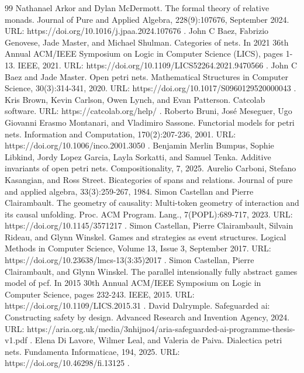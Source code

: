 \begin{thebibliography}{99}
 Nathanael Arkor and Dylan McDermott. The formal theory of relative monads. Journal of Pure and Applied Algebra, 228(9):107676, September 2024. URL: https://doi.org/10.1016/j.jpaa.2024.107676 .
 John C Baez, Fabrizio Genovese, Jade Master, and Michael Shulman. Categories of nets. In 2021 36th Annual ACM/IEEE Symposium on Logic in Computer Science (LICS), pages 1-13. IEEE, 2021. URL: https://doi.org/10.1109/LICS52264.2021.9470566 .
 John C Baez and Jade Master. Open petri nets. Mathematical Structures in Computer Science, 30(3):314-341, 2020. URL: https://doi.org/10.1017/S0960129520000043 .
 Kris Brown, Kevin Carlson, Owen Lynch, and Evan Patterson. Catcolab software. URL: https://catcolab.org/help/ .
 Roberto Bruni, José Meseguer, Ugo Giovanni Erasmo Montanari, and Vladimiro Sassone. Functorial models for petri nets. Information and Computation, 170(2):207-236, 2001. URL: https://doi.org/10.1006/inco.2001.3050 .
 Benjamin Merlin Bumpus, Sophie Libkind, Jordy Lopez Garcia, Layla Sorkatti, and Samuel Tenka. Additive invariants of open petri nets. Compositionality, 7, 2025.
 Aurelio Carboni, Stefano Kasangian, and Ross Street. Bicategories of spans and relations. Journal of pure and applied algebra, 33(3):259-267, 1984.
 Simon Castellan and Pierre Clairambault. The geometry of causality: Multi-token geometry of interaction and its causal unfolding. Proc. ACM Program. Lang., 7(POPL):689-717, 2023. URL: https://doi.org/10.1145/3571217 .
 Simon Castellan, Pierre Clairambault, Silvain Rideau, and Glynn Winskel. Games and strategies as event structures. Logical Methods in Computer Science, Volume 13, Issue 3, September 2017. URL: https://doi.org/10.23638/lmcs-13(3:35)2017 .
 Simon Castellan, Pierre Clairambault, and Glynn Winskel. The parallel intensionally fully abstract games model of pcf. In 2015 30th Annual ACM/IEEE Symposium on Logic in Computer Science, pages 232-243. IEEE, 2015. URL: https://doi.org/10.1109/LICS.2015.31 .
 David Dalrymple. Safeguarded ai: Constructing safety by design. Advanced Research and Invention Agency, 2024. URL: https://aria.org.uk/media/3nhijno4/aria-safeguarded-ai-programme-thesis-v1.pdf .
 Elena Di Lavore, Wilmer Leal, and Valeria de Paiva. Dialectica petri nets. Fundamenta Informaticae, 194, 2025. URL: https://doi.org/10.46298/fi.13125 .

\end{thebibliography}
